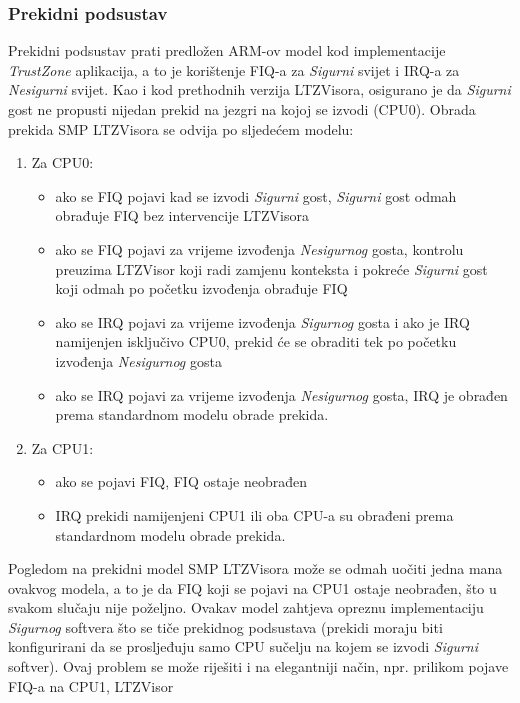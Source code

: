 \documentclass[times, utf8, diplomski, numeric]{fer}
\begin{document}
\subsubsection{Prekidni podsustav}
Prekidni podsustav prati predložen ARM-ov model kod implementacije \textit{TrustZone} aplikacija, a to je korištenje FIQ-a za
\textit{Sigurni} svijet i IRQ-a za \textit{Nesigurni} svijet. Kao i kod prethodnih verzija LTZVisora,
osigurano je da \textit{Sigurni} gost ne propusti nijedan prekid na jezgri na kojoj se izvodi (CPU0). Obrada prekida SMP
LTZVisora se odvija po sljedećem modelu:
\begin{enumerate}
  \item{Za CPU0:}
    \begin{itemize}
      \item{ako se FIQ pojavi kad se izvodi \textit{Sigurni} gost, \textit{Sigurni} gost odmah obrađuje FIQ bez intervencije
      LTZVisora}
      \item{ako se FIQ pojavi za vrijeme izvođenja \textit{Nesigurnog} gosta, kontrolu preuzima LTZVisor koji radi zamjenu
      konteksta i pokreće \textit{Sigurni} gost koji odmah po početku izvođenja obrađuje FIQ}
      \item{ako se IRQ pojavi za vrijeme izvođenja \textit{Sigurnog} gosta i ako je IRQ namijenjen isključivo CPU0, prekid će
      se obraditi tek po početku izvođenja \textit{Nesigurnog} gosta}
      \item{ako se IRQ pojavi za vrijeme izvođenja \textit{Nesigurnog} gosta, IRQ je obrađen prema standardnom modelu obrade
      prekida.}
    \end{itemize}
  \item{Za CPU1:}
    \begin{itemize}
      \item{ako se pojavi FIQ, FIQ ostaje neobrađen}
      \item{IRQ prekidi namijenjeni CPU1 ili oba CPU-a su obrađeni prema standardnom modelu obrade prekida.}
    \end{itemize}
\end{enumerate}
Pogledom na prekidni model SMP LTZVisora može se odmah uočiti jedna mana ovakvog modela, a to je da FIQ koji se pojavi na CPU1
ostaje neobrađen, što u svakom slučaju nije poželjno. Ovakav model zahtjeva opreznu implementaciju \textit{Sigurnog} softvera
što se tiče prekidnog podsustava (prekidi moraju biti konfigurirani da se prosljeđuju samo CPU sučelju na kojem se izvodi
\textit{Sigurni} softver). Ovaj problem se može riješiti i na elegantniji način, npr. prilikom pojave FIQ-a na CPU1, LTZVisor
\end{document}
